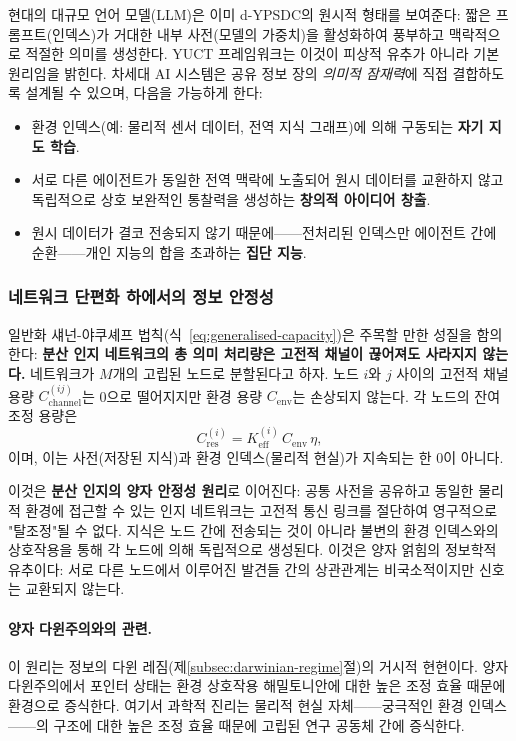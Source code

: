 \documentclass[12pt,a4paper]{article}
\begin{document}
	현대의 대규모 언어 모델(LLM)은 이미 d-YPSDC의 원시적 형태를 보여준다: 짧은 프롬프트(인덱스)가 거대한 내부 사전(모델의 가중치)을 활성화하여 풍부하고 맥락적으로 적절한 의미를 생성한다. YUCT 프레임워크는 이것이 피상적 유추가 아니라 기본 원리임을 밝힌다. 차세대 AI 시스템은 공유 정보 장의 \emph{의미적 잠재력}에 직접 결합하도록 설계될 수 있으며, 다음을 가능하게 한다:
	\begin{itemize}
		\item 환경 인덱스(예: 물리적 센서 데이터, 전역 지식 그래프)에 의해 구동되는 \textbf{자기 지도 학습}.
		\item 서로 다른 에이전트가 동일한 전역 맥락에 노출되어 원시 데이터를 교환하지 않고 독립적으로 상호 보완적인 통찰력을 생성하는 \textbf{창의적 아이디어 창출}.
		\item 원시 데이터가 결코 전송되지 않기 때문에——전처리된 인덱스만 에이전트 간에 순환——개인 지능의 합을 초과하는 \textbf{집단 지능}.
	\end{itemize}
	
	\subsubsection{네트워크 단편화 하에서의 정보 안정성}
	\label{subsubsec:info-stability-fragmentation}
	
	일반화 섀넌-야쿠셰프 법칙(식~\ref{eq:generalised-capacity})은 주목할 만한 성질을 함의한다: \textbf{분산 인지 네트워크의 총 의미 처리량은 고전적 채널이 끊어져도 사라지지 않는다.} 네트워크가 $M$개의 고립된 노드로 분할된다고 하자. 노드 $i$와 $j$ 사이의 고전적 채널 용량 $C_{\mathrm{channel}}^{(ij)}$는 0으로 떨어지지만 환경 용량 $C_{\mathrm{env}}$는 손상되지 않는다. 각 노드의 잔여 조정 용량은
	\[
	C_{\mathrm{res}}^{(i)} = K_{\mathrm{eff}}^{(i)} \, C_{\mathrm{env}} \, \eta,
	\]
	이며, 이는 사전(저장된 지식)과 환경 인덱스(물리적 현실)가 지속되는 한 0이 아니다.
	
	이것은 \textbf{분산 인지의 양자 안정성 원리}로 이어진다: 공통 사전을 공유하고 동일한 물리적 환경에 접근할 수 있는 인지 네트워크는 고전적 통신 링크를 절단하여 영구적으로 "탈조정"될 수 없다. 지식은 노드 간에 전송되는 것이 아니라 불변의 환경 인덱스와의 상호작용을 통해 각 노드에 의해 독립적으로 생성된다. 이것은 양자 얽힘의 정보학적 유추이다: 서로 다른 노드에서 이루어진 발견들 간의 상관관계는 비국소적이지만 신호는 교환되지 않는다.
	
	\paragraph{양자 다윈주의와의 관련.}
	이 원리는 정보의 다윈 레짐(제\ref{subsec:darwinian-regime}절)의 거시적 현현이다. 양자 다윈주의에서 포인터 상태는 환경 상호작용 해밀토니안에 대한 높은 조정 효율 때문에 환경으로 증식한다. 여기서 과학적 진리는 물리적 현실 자체——궁극적인 환경 인덱스——의 구조에 대한 높은 조정 효율 때문에 고립된 연구 공동체 간에 증식한다.
	
\end{document}
